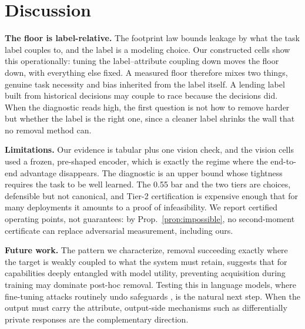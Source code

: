 \documentclass[letterpaper]{article} %
\begin{document}
\section{Discussion}
\textbf{The floor is label-relative.}
The footprint law bounds leakage by what the task label couples to, and the
label is a modeling choice. Our constructed cells show this operationally:
tuning the label--attribute coupling down moves the floor down, with everything
else fixed. A measured floor therefore mixes two things, genuine task
necessity and bias inherited from the label itself. A lending label built from
historical decisions may couple to race because the decisions did. When the
diagnostic reads high, the first question is not how to remove harder but
whether the label is the right one, since a cleaner label shrinks the wall
that no removal method can.

\textbf{Limitations.}
Our evidence is tabular plus one vision check, and the vision cells used a
frozen, pre-shaped encoder, which is exactly the regime where the end-to-end
advantage disappears. The diagnostic is an upper bound whose tightness
requires the task to be well learned. The 0.55 bar and the two tiers are
choices, defensible but not canonical, and Tier-2 certification is expensive
enough that for many deployments it amounts to a proof of infeasibility. We
report certified operating points, not guarantees: by
Prop.~\ref{prop:impossible}, no second-moment certificate can replace
adversarial measurement, including ours.

\textbf{Future work.}
The pattern we characterize, removal succeeding exactly where the target is
weakly coupled to what the system must retain, suggests that for capabilities
deeply entangled with model utility, preventing acquisition during training
may dominate post-hoc removal. Testing this in language models, where
fine-tuning attacks routinely undo safeguards
\citep{tamirisa2024tar,qi2024durability}, is the natural next step. When the
output must carry the attribute, output-side mechanisms such as differentially
private responses \citep{dwork2014dp} are the complementary direction.
\end{document}
